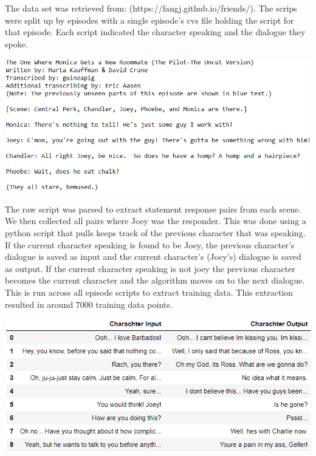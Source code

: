 \documentclass[12pt]{article}
\begin{document}
The data set was retrieved from: (https://fangj.github.io/friends/). The scrips were split up by episodes with a single episode's cvs file holding the script for that episode. Each script indicated the character speaking and the dialogue they spoke.
\begin{center}
\includegraphics[width=160mm]{rawData.PNG}
\end{center}

The raw script was parsed to extract statement response pairs from each scene. We then collected all pairs where Joey was the responder. This was done using a python script that pulls keeps track of the previous character that was speaking. If the current character speaking is found to be Joey, the previous character's dialogue is saved as input and the current character's (Joey's) dialogue is saved as output. If the current character speaking is not joey the previous character becomes the current character and the algorithm moves on to the next dialogue. This is run across all episode scripts to extract training data. This extraction resulted in around 7000 training data points.
\begin{center}
\includegraphics[width=160mm]{charachterData.PNG}
\end{center}
\end{document}
